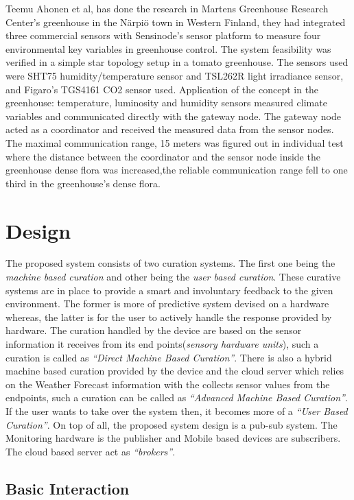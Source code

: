\documentclass[10pt]{article}
\begin{document}
Teemu Ahonen et al, has done the research in Martens Greenhouse Research Center’s greenhouse in the Närpiö town in Western Finland, they had integrated three commercial sensors with Sensinode’s sensor platform to measure four environmental key variables in greenhouse control.
The system feasibility was verified in a simple star topology setup in a tomato greenhouse.
The sensors used were SHT75 humidity/temperature sensor and TSL262R light irradiance sensor, and Figaro’s TGS4161 CO2 sensor used. 
Application of the concept in the greenhouse: temperature, luminosity and humidity sensors measured climate variables and communicated directly with the gateway node. 
The gateway node acted as a coordinator and received the measured data from the sensor nodes. 
The maximal communication range, 15 meters was figured out in individual test where the distance between the coordinator and the sensor node inside the greenhouse dense flora was increased,the reliable communication range fell to one third in the greenhouse's dense flora. 

\section*{Design}

The proposed system consists of two curation systems. 
The first one being the \emph{machine based curation} and other being the \emph{user based curation}. 
These curative systems are in place to provide a smart and involuntary feedback to the given environment. 
The former is more of predictive system devised on a hardware whereas, the latter is for the user to actively handle the response provided by hardware. 
The curation handled by the device are based on the sensor information it receives from its end points(\emph{sensory hardware units}), such a curation is called as \emph{``Direct Machine Based Curation''}. 
There is also a hybrid machine based curation provided by the device and the cloud server which relies on the Weather Forecast information with the collects sensor values from the endpoints, such a curation can be called as \emph{``Advanced Machine Based Curation''}. 
If the user wants to take over the system then, it becomes more of a \emph{``User Based Curation''}. 
On top of all, the proposed system design is a pub-sub system. 
The Monitoring hardware is the publisher and Mobile based devices are subscribers. 
The cloud based server act as \emph{``brokers''}. 

\subsection*{Basic Interaction}
\end{document}

